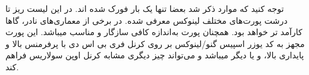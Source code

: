 توجه کنید که موارد ذکر شد بعضا تنها یک بار فورک شده اند. در این لیست ریز تا درشت
پورت‌های مختلف لینوکس معرفی شده. در برخی از معماری‌های نادر،
گاها کارآمد تر خواهد بود. همچنان پورت
به‌اندازه کافی سازگار و مناسب میباشد. این پورت مجهز به کد یوزر اسپیس گنو/لینوکس بر روی کرنل فری بی اس دی با پرفرمنس بالا و پایداری بالا،
و یا دیگر 
میباشد و می‌تواند چیز دیگری مشابه کرنل اوپن سولاریس فراهم کند.


